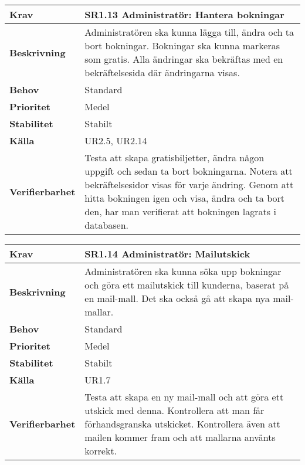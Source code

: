 \documentclass[a4paper, twoside, 11pt, titlepage]{article}
\begin{document}
		\begin{tabular} { p{2.6cm} p{12.5cm} }
			\hline
			\sffamily\textbf{Krav} & \sffamily\textbf{SR1.13 Administratör: Hantera bokningar } \\
			\hline
			\sffamily\textbf{Beskrivning} & Administratören ska kunna lägga till, ändra och ta bort bokningar. Bokningar ska kunna markeras som gratis. Alla ändringar ska bekräftas med en bekräftelsesida där ändringarna visas.  \\
			\hline
			\sffamily\textbf{Behov} & Standard  \\
			\hline
			\sffamily\textbf{Prioritet} & Medel  \\
			\hline
			\sffamily\textbf{Stabilitet} & Stabilt  \\
			\hline
			\sffamily\textbf{Källa} & UR2.5, UR2.14  \\
			\hline
			\sffamily\textbf{Verifierbarhet} & Testa att skapa gratisbiljetter, ändra någon uppgift och sedan ta bort bokningarna. Notera att bekräftelsesidor visas för varje ändring. Genom att hitta bokningen igen och visa, ändra och ta bort den, har man verifierat att bokningen lagrats i databasen.  \\
			\hline
		\end{tabular}
		\vspace{6mm}

		\begin{tabular} { p{2.6cm} p{12.5cm} }
			\hline
			\sffamily\textbf{Krav} & \sffamily\textbf{SR1.14 Administratör: Mailutskick } \\
			\hline
			\sffamily\textbf{Beskrivning} & Administratören ska kunna söka upp bokningar och göra ett mailutskick till kunderna, baserat på en mail-mall. Det ska också gå att skapa nya mail-mallar.  \\
			\hline
			\sffamily\textbf{Behov} & Standard  \\
			\hline
			\sffamily\textbf{Prioritet} & Medel  \\
			\hline
			\sffamily\textbf{Stabilitet} & Stabilt  \\
			\hline
			\sffamily\textbf{Källa} & UR1.7  \\
			\hline
			\sffamily\textbf{Verifierbarhet} & Testa att skapa en ny mail-mall och att göra ett utskick med denna. Kontrollera att man får förhandsgranska utskicket. Kontrollera även att mailen kommer fram och att mallarna använts korrekt.  \\
			\hline
		\end{tabular}
		\vspace{6mm}
\end{document}
